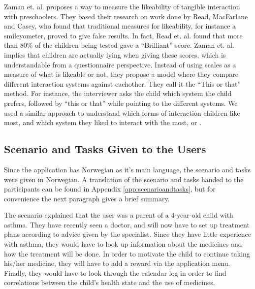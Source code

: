 Zaman et. al. proposes a way to measure the likeability of tangible interaction with preschoolers\cite{zaman2007measure}. They based their research on work done by Read, MacFarlane and Casey\cite{read2002endurability}, who found that traditional measures for likeability, for instance a smileyometer, proved to give false results. In fact, Read et. al. found that more than 80\% of the children being tested gave a ``Brilliant'' score. Zaman et. al. implies that children are actually lying when giving these scores, which is understandable from a questionnaire perspective. Instead of using scales as a measure of what is likeable or not, they propose a model where they compare different interaction systems against eachother. They call it the ``This or that'' method. For instance, the interviewer asks the child which system the child prefers, followed by ``this or that'' while pointing to the different systems. We used a similar approach to understand which forms of interaction children like most, and which system they liked to interact with the most, \app{} or \ab{}.   


\subsection{Scenario and Tasks Given to the Users}
\label{sec:scenarioandtasksgiventotheusers}
Since the application has Norwegian as it's main language, the scenario and tasks were given in Norwegian. A translation of the scenario and tasks handed to the participants can be found in Appendix \ref{app:scenarioandtasks}, but for convenience the next paragraph gives a brief summary.

The scenario explained that the user was a parent of a 4-year-old child with asthma. They have recently seen a doctor, and will now have to set up treatment plans according to advice given by the specialist. Since they have little experience with asthma, they would have to look up information about the medicines and how the treatment will be done. In order to motivate the child to continue taking his/her medicine, they will have to add a reward via the application menu. Finally, they would have to look through the calendar log in order to find correlations between the child's health state and the use of medicines. 
